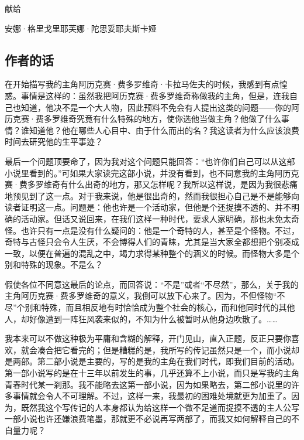 \clearpage
\begin{center}
\par 献给
\par 安娜·格里戈里耶芙娜·陀思妥耶夫斯卡娅
\end{center}





\subsection*{作者的话}


\par 在开始描写我的主角阿历克赛·费多罗维奇·卡拉马佐夫的时候，我感到有点惶惑。事情是这样的：虽然我把阿历克赛·费多罗维奇称做我的主角，但是，连我自己也知道，他决不是一个大人物，因此预料不免会有人提出这类的问题——你的阿历克赛·费多罗维奇究竟有什么特殊的地方，使你选他当做主角？他做了什么事情？谁知道他？他在哪些人心目中、由于什么而出的名？我这读者为什么应该浪费时间去研究他的生平事迹？
\par 最后一个问题顶要命了，因为我对这个问题只能回答：“也许你们自己可以从这部小说里看到的。”可如果大家读完这部小说，并没有看到，也不同意我的主角阿历克赛·费多罗维奇有什么出奇的地方，那又怎样呢？我所以这样说，是因为我很悲痛地预见到了这一点。对于我来说，他是很出奇的，然而我很担心自己是不是能够向读者证明这一点。问题是：他也许是一个活动家，但他是个还捉摸不透的、并不明确的活动家。但话又说回来，在我们这样一种时代，要求人家明确，那也未免太奇怪。也许只有一点是没有什么疑问的：他是一个奇特的人，甚至是个怪物。不过，奇特与古怪只会令人生厌，不会博得人们的青睐，尤其是当大家全都想把个别凑成一致，以便在普遍的混乱之中，竭力求得某种整个的涵义的时候。而怪物大多是个别和特殊的现象。不是么？
\par 假使各位不同意这最后的论点，而回答说：“不是”或者“不尽然”，那么，关于我的主角阿历克赛·费多罗维奇的意义，我倒可以放下心来了。因为，不但怪物“不尽”个别和特殊，而且相反地有时恰恰成为整个社会的核心，而和他同时代的其他人，却好像遭到一阵狂风袭来似的，不知为什么被暂时从他身边吹散了。……
\par 我本来可以不做这种极为平庸和含糊的解释，开门见山，直入正题，反正只要你喜欢，就会凑合把它看完的；但是糟糕的是，我所写的传记虽然只是一个，而小说却是两部。第二部小说是主要的，写的是我的主角在我们时代，即我们目前的活动。第一部小说写的是在十三年以前发生的事，几乎还算不上小说，而只是写我的主角青春时代某一刹那。我不能略去这第一部小说，因为如果略去，第二部小说里的许多事情就会令人不可理解。不过，这样一来，我最初的困难处境就更为加重了。因为，既然我这个写传记的人本身都认为给这样一个微不足道而捉摸不透的主人公写一部小说也许还嫌浪费笔墨，那就更不必说再写两部了，而我又如何解释自己的不自量力呢？

